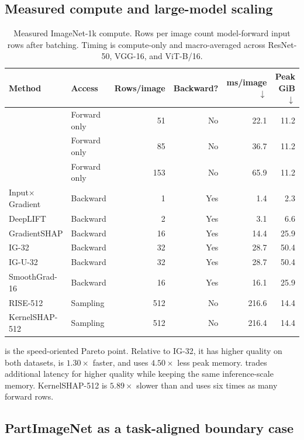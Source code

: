 \subsection{Measured compute and large-model scaling}

\begin{table}[!tb]
\centering
\caption{Measured ImageNet-1k compute. Rows per image count model-forward input rows after batching. Timing is compute-only and macro-averaged across ResNet-50, VGG-16, and ViT-B/16.}
\label{tab:forward-attribution-compute}
\footnotesize
\setlength{\tabcolsep}{4.5pt}
\begin{tabular}{llrrrr}
\toprule
Method & Access & Rows/image & Backward? & ms/image $\downarrow$ & Peak GiB $\downarrow$ \\
\midrule
\decaf-3 & Forward only & 51 & No & 22.1 & 11.2 \\
\decaf-5 & Forward only & 85 & No & 36.7 & 11.2 \\
\decaf-9 & Forward only & 153 & No & 65.9 & 11.2 \\
Input$\times$Gradient & Backward & 1 & Yes & 1.4 & 2.3 \\
DeepLIFT & Backward & 2 & Yes & 3.1 & 6.6 \\
GradientSHAP & Backward & 16 & Yes & 14.4 & 25.9 \\
IG-32 & Backward & 32 & Yes & 28.7 & 50.4 \\
IG-U-32 & Backward & 32 & Yes & 28.7 & 50.4 \\
SmoothGrad-16 & Backward & 16 & Yes & 16.1 & 25.9 \\
RISE-512 & Sampling & 512 & No & 216.6 & 14.4 \\
KernelSHAP-512 & Sampling & 512 & No & 216.4 & 14.4 \\
\bottomrule
\end{tabular}
\end{table}

 is the speed-oriented Pareto point. Relative to IG-32, it has higher quality on both datasets, is $1.30\times$ faster, and uses $4.50\times$ less peak memory.  trades additional latency for higher quality while keeping the same inference-scale memory. KernelSHAP-512 is $5.89\times$ slower than  and uses six times as many forward rows.




\subsection{PartImageNet as a task-aligned boundary case}

